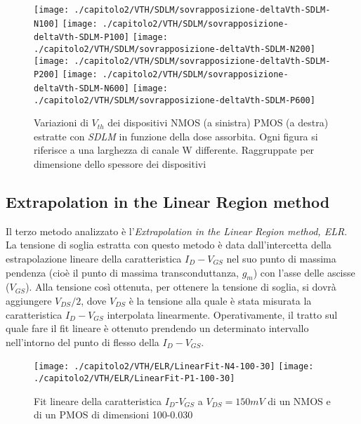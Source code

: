 \begin{figure}[H]
  \centering
  \texttt{[image: ./capitolo2/VTH/SDLM/sovrapposizione-deltaVth-SDLM-N100]}
  \texttt{[image: ./capitolo2/VTH/SDLM/sovrapposizione-deltaVth-SDLM-P100]}
  \texttt{[image: ./capitolo2/VTH/SDLM/sovrapposizione-deltaVth-SDLM-N200]}
  \texttt{[image: ./capitolo2/VTH/SDLM/sovrapposizione-deltaVth-SDLM-P200]}
  \texttt{[image: ./capitolo2/VTH/SDLM/sovrapposizione-deltaVth-SDLM-N600]}
  \texttt{[image: ./capitolo2/VTH/SDLM/sovrapposizione-deltaVth-SDLM-P600]}
  \caption[Dati $\Delta V_{th}$ estratti con SDLM]{Variazioni di $V_{th}$ dei dispositivi NMOS (a sinistra) PMOS (a destra) estratte con \emph{SDLM} in funzione della dose assorbita. Ogni figura si riferisce a una larghezza di canale W differente. Raggruppate per dimensione dello spessore dei dispositivi}
  \label{fig:deltaVthSDLM}
\end{figure}

\subsection[ELR]{Extrapolation in the Linear Region method}
Il terzo metodo analizzato è l'\emph{Extrapolation in the Linear Region method, ELR}\cite{art2}. La tensione di soglia estratta con questo metodo è data dall'intercetta della estrapolazione lineare della caratteristica $I_D-V_{GS}$ nel suo punto di massima pendenza (cioè il punto di massima transconduttanza, $g_m$) con l'asse delle ascisse ($V_{GS}$). Alla tensione così ottenuta, per ottenere la tensione di soglia, si dovrà aggiungere $V_{DS}/2$, dove $V_{DS}$ è la tensione alla quale è stata misurata la caratteristica $I_D-V_{GS}$ interpolata linearmente.
Operativamente, il tratto sul quale fare il fit lineare è ottenuto prendendo un determinato intervallo nell'intorno del punto di flesso della $I_D-V_{GS}$.

\begin{figure}[h!]
  \centering
  \texttt{[image: ./capitolo2/VTH/ELR/LinearFit-N4-100-30]}
  \texttt{[image: ./capitolo2/VTH/ELR/LinearFit-P1-100-30]}
  \caption[Applicazione ELR]{Fit lineare della caratteristica  $I_D$-$V_{GS}$ a $V_{DS}=150mV$ di un NMOS e di un PMOS di dimensioni 100-0.030 }
\end{figure}

